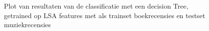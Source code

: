 \begin{figure}%
    \centering
    \caption{Plot van resultaten van de classificatie met een decision Tree, getrained op LSA features met als trainset boekrecensies en testset muziekrecensies}
    \label{fig:example}%
\end{figure}
%  

